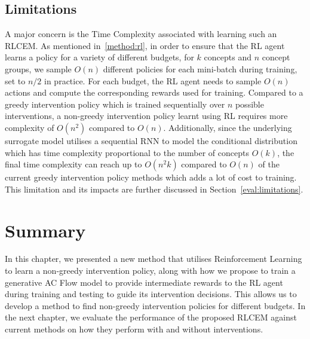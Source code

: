 \subsection{Limitations}\label{method:limitations}

A major concern is the Time Complexity associated with learning
such an RLCEM. As mentioned in~\ref{method:rl}, in order to ensure
that the RL agent learns a policy for a variety of different budgets,
for $k$ concepts and $n$ concept groups,
 we sample $O(n)$ different policies for each mini-batch during training, set 
to $n/2$ in practice. For each budget, the RL agent needs to sample
$O(n)$ actions and compute the corresponding rewards used for training. 
Compared to
a greedy intervention policy which is trained sequentially over
$n$ possible interventions, 
a non-greedy intervention policy learnt using
RL requires more complexity of $O(n^2)$ compared to $O(n)$.
Additionally, since the underlying surrogate model utilises a sequential
RNN to model the conditional distribution which has time complexity
proportional to the number of concepts $O(k)$, the final 
time complexity can reach up to $O(n^2k)$ compared to $O(n)$ of the current
greedy intervention policy methods which adds a lot of cost to training.
This limitation
and its impacts
are further discussed in Section~\ref{eval:limitations}.\\

\section{Summary}
In this chapter, we presented a new method 
that utilises Reinforcement Learning
to learn a non-greedy intervention policy,
along with how we propose 
to train a generative AC Flow model to
provide intermediate rewards to the RL agent during
training and testing to guide its intervention decisions.
This allows us to
develop a method to find non-greedy intervention policies for different budgets.
In the next chapter, we evaluate the performance of the proposed
RLCEM against current methods on how
they perform with and without interventions.


